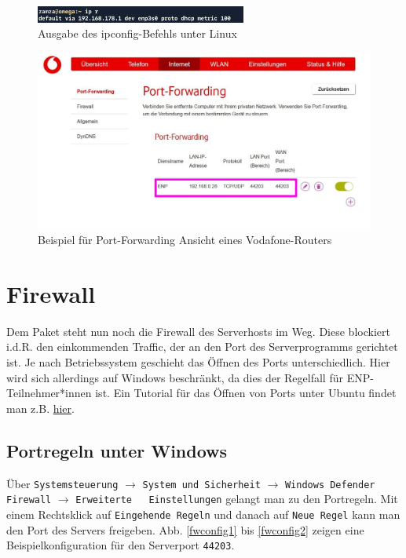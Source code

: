 \documentclass[11pt, a4paper]{article}
\newcommand{\code}[1]{{\lstinline{#1}}}
\begin{document}
\begin{figure}[H]
\centering
\includegraphics[width=0.618\textwidth]{graphics/gatewayip_linux}
\caption{Ausgabe des ipconfig-Befehls unter Linux}\label{glin}
\end{figure}

\begin{figure}[H]
\centering
\includegraphics[width=\textwidth]{graphics/forv}
\caption{Beispiel für Port-Forwarding Ansicht eines Vodafone-Routers}\label{forv}
\end{figure}

\section{Firewall}
Dem Paket steht nun noch die Firewall des Serverhosts im Weg. Diese blockiert
i.d.R. den einkommenden Traffic, der an den Port des Serverprogramms gerichtet
ist. Je nach Betriebssystem geschieht das Öffnen des Ports unterschiedlich.
Hier wird sich allerdings auf Windows beschränkt, da dies der Regelfall für
ENP-Teilnehmer*innen ist. Ein Tutorial für das Öffnen von Ports unter Ubuntu
findet man z.B.
\href{https://www.cyberciti.biz/faq/how-to-open-firewall-port-on-ubuntu-linux-12-04-14-04-lts/}{hier}.\\

\subsection{Portregeln unter Windows}
Über \code{Systemsteuerung} $\rightarrow$ \code{System und Sicherheit}
$\rightarrow$ \code{Windows Defender Firewall} $\rightarrow$ \code{Erweiterte
  Einstellungen} gelangt man zu den Portregeln. Mit einem Rechtsklick auf
\code{Eingehende Regeln} und danach auf \code{Neue Regel} kann man den Port des
Servers freigeben. Abb. \ref{fwconfig1} bis \ref{fwconfig2} zeigen eine
Beispielkonfiguration für den Serverport
\code{44203}.
\end{document}
